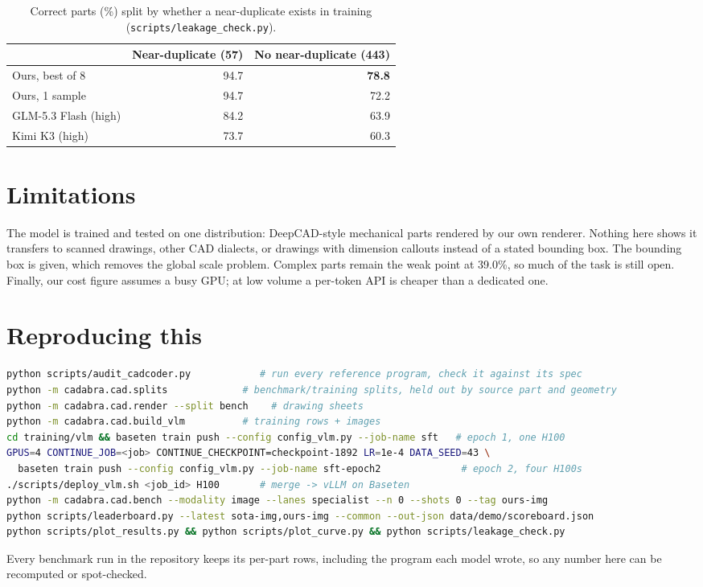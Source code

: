 \documentclass[11pt]{article}
\begin{document}
\begin{table}[h]
\centering\small
\begin{tabular}{lrr}
\toprule
& Near-duplicate (57) & No near-duplicate (443) \\
\midrule
Ours, best of 8 & 94.7 & \textbf{78.8} \\
Ours, 1 sample & 94.7 & 72.2 \\
GLM-5.3 Flash (high) & 84.2 & 63.9 \\
Kimi K3 (high) & 73.7 & 60.3 \\
\bottomrule
\end{tabular}
\caption{Correct parts (\%) split by whether a near-duplicate exists in training
(\texttt{scripts/leakage\_check.py}).}
\label{tab:leakage}
\end{table}

\section{Limitations}

The model is trained and tested on one distribution: DeepCAD-style mechanical parts rendered by our own renderer.
Nothing here shows it transfers to scanned drawings, other CAD dialects, or drawings with dimension callouts instead
of a stated bounding box. The bounding box is given, which removes the global scale problem. Complex parts remain
the weak point at 39.0\%, so much of the task is still open. Finally, our cost figure assumes a busy GPU; at low
volume a per-token API is cheaper than a dedicated one.

\section{Reproducing this}

\begin{lstlisting}[language=bash]
python scripts/audit_cadcoder.py            # run every reference program, check it against its spec
python -m cadabra.cad.splits             # benchmark/training splits, held out by source part and geometry
python -m cadabra.cad.render --split bench    # drawing sheets
python -m cadabra.cad.build_vlm          # training rows + images
cd training/vlm && baseten train push --config config_vlm.py --job-name sft   # epoch 1, one H100
GPUS=4 CONTINUE_JOB=<job> CONTINUE_CHECKPOINT=checkpoint-1892 LR=1e-4 DATA_SEED=43 \
  baseten train push --config config_vlm.py --job-name sft-epoch2              # epoch 2, four H100s
./scripts/deploy_vlm.sh <job_id> H100       # merge -> vLLM on Baseten
python -m cadabra.cad.bench --modality image --lanes specialist --n 0 --shots 0 --tag ours-img
python scripts/leaderboard.py --latest sota-img,ours-img --common --out-json data/demo/scoreboard.json
python scripts/plot_results.py && python scripts/plot_curve.py && python scripts/leakage_check.py
\end{lstlisting}

Every benchmark run in the repository keeps its per-part rows, including the program each model wrote, so any number
here can be recomputed or spot-checked.
\end{document}

